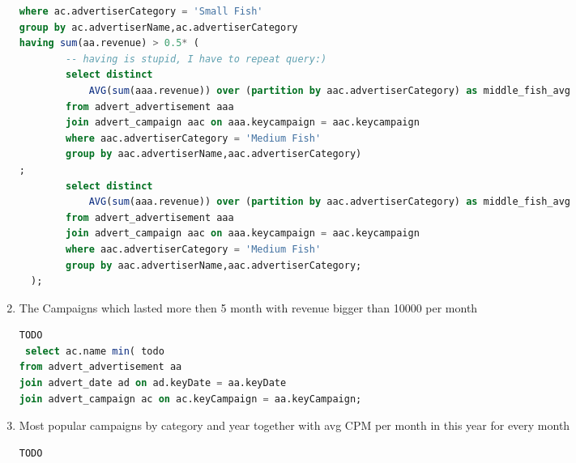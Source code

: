 \begin{enumerate}
\begin{lstlisting}[language=sql]
where ac.advertiserCategory = 'Small Fish'
group by ac.advertiserName,ac.advertiserCategory
having sum(aa.revenue) > 0.5* (
        -- having is stupid, I have to repeat query:)
        select distinct
            AVG(sum(aaa.revenue)) over (partition by aac.advertiserCategory) as middle_fish_avg
        from advert_advertisement aaa 
        join advert_campaign aac on aaa.keycampaign = aac.keycampaign
        where aac.advertiserCategory = 'Medium Fish'   
        group by aac.advertiserName,aac.advertiserCategory)
;
        select distinct
            AVG(sum(aaa.revenue)) over (partition by aac.advertiserCategory) as middle_fish_avg
        from advert_advertisement aaa 
        join advert_campaign aac on aaa.keycampaign = aac.keycampaign
        where aac.advertiserCategory = 'Medium Fish'   
        group by aac.advertiserName,aac.advertiserCategory;
  );      
  \end{lstlisting}
\item    The Campaigns which lasted more then 5 month with revenue bigger than 10000 per month
  \begin{lstlisting}[language=sql] 
 TODO
 select ac.name min( todo
from advert_advertisement aa
join advert_date ad on ad.keyDate = aa.keyDate
join advert_campaign ac on ac.keyCampaign = aa.keyCampaign;
  \end{lstlisting}
\item    Most popular campaigns by category and year together with avg CPM per month in this year for every month
  \begin{lstlisting}[language=sql] 
  TODO
  \end{lstlisting}
\end{enumerate}


